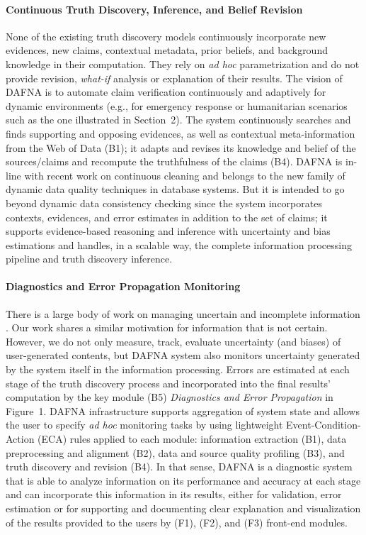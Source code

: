 \documentclass[prodmode,acmtecs]{acmsmall} %
\begin{document}
\paragraph*{Continuous Truth Discovery, Inference, and Belief Revision }



None of the existing truth discovery models continuously incorporate new evidences, 
new claims, contextual metadata, prior beliefs, and background knowledge in their computation.
They rely on {\it ad hoc} parametrization and do not provide revision, {\it what-if} analysis
or explanation of their results. The vision of DAFNA is to automate claim verification continuously
and adaptively for dynamic environments (e.g., for emergency response or humanitarian scenarios such
as the one illustrated in Section~2). The system continuously searches and finds supporting and opposing 
evidences, as well as contextual meta-information from the Web of Data (B1); it adapts and revises its knowledge
and belief of the sources/claims and recompute the truthfulness of the claims (B4).  
DAFNA is in-line with recent work on continuous cleaning \cite{VCSM14} and belongs to the new family of dynamic data 
quality techniques in database systems. But it is intended to go beyond dynamic data consistency checking since the 
system incorporates contexts, evidences, and error estimates in addition to the set of claims; it supports evidence-based
reasoning and inference with uncertainty and bias estimations and handles, in a scalable way, the complete information processing
pipeline and truth discovery inference.

\paragraph*{Diagnostics and Error Propagation Monitoring}


There is a large body of work on managing uncertain and incomplete information \cite{GreenT06,AgrawalSUW10}. Our work shares a similar 
motivation for information that is not certain. However, we do not only measure, track, evaluate uncertainty (and biases) of user-generated 
contents, but DAFNA system also monitors uncertainty generated by the system itself in the information processing. Errors are estimated at 
each stage of the truth discovery process and incorporated into the final results' computation by the key module (B5) {\it Diagnostics and Error
Propagation} in Figure~1. DAFNA infrastructure supports aggregation of system state and allows the user to specify {\it ad hoc} monitoring tasks 
by using lightweight Event-Condition-Action (ECA) rules applied to each module: information extraction (B1),  data preprocessing and alignment (B2),
data and source quality profiling (B3), and truth discovery  and revision (B4). In that sense,  DAFNA is a diagnostic system that is able to analyze 
information on its performance and accuracy at each stage and can incorporate this information in its results, either for validation, error estimation
or for supporting and documenting clear  explanation and visualization of the results provided to the users by (F1), (F2), and (F3) front-end modules. 
\end{document}
